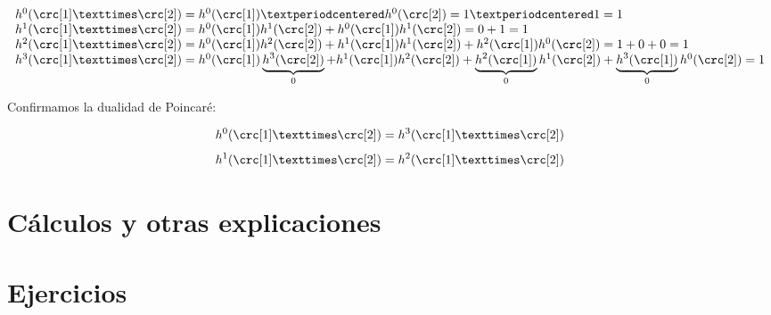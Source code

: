 \documentclass[palatino, bibnumbers]{apuntes}
\begin{document}
\begin{example}

\begin{equation}
	\begin{array}{l}
		h^0(\crc[1]×\crc[2]) = h^0(\crc[1])·h^0(\crc[2]) = 1·1 = 1\\
		h^1(\crc[1]×\crc[2]) = h^0(\crc[1])h^1(\crc[2]) + h^0(\crc[1])h^1(\crc[2]) = 0 + 1 = 1\\
		h^2(\crc[1]×\crc[2]) = h^0(\crc[1])h^2(\crc[2]) + h^1(\crc[1])h^1(\crc[2]) + h^2(\crc[1])h^0(\crc[2]) =  1+0+0 = 1\\
		h^3(\crc[1]×\crc[2]) = h^0(\crc[1])\underbrace{h^3(\crc[2])}_{0} + h^1(\crc[1])h^2(\crc[2]) + \underbrace{h^2(\crc[1])}_{0}h^1(\crc[2]) + \underbrace{h^3(\crc[1])}_{0}h^0(\crc[2]) = 1
	\end{array}
\end{equation}

Confirmamos la dualidad de Poincaré: 

\[
h^0(\crc[1]×\crc[2]) = h^3(\crc[1]×\crc[2])
\]
\[
h^1(\crc[1]×\crc[2]) = h^2(\crc[1]×\crc[2])
\]

\end{example}

\appendix

\chapter{Cálculos y otras explicaciones}


\chapter{Ejercicios}


{}
\printindex
\end{document}
